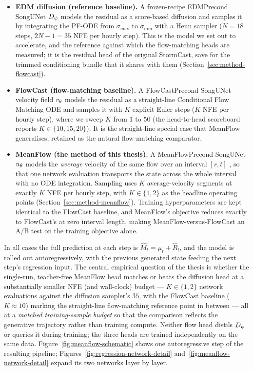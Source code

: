 \begin{itemize}
  \item \textbf{EDM diffusion (reference baseline).} A frozen-recipe EDMPrecond SongUNet $D_{\psi}$ models the residual as a score-based diffusion and samples it by integrating the PF-ODE from $\sigma_{\max}$ to $\sigma_{\min}$ with a Heun sampler ($N = 18$ steps, $2N - 1 = 35$ NFE per hourly step). This is the model we set out to accelerate, and the reference against which the flow-matching heads are measured; it is the residual head of the original StormCast, save for the trimmed conditioning bundle that it shares with them (Section~\ref{sec:method-flowcast}).
  \item \textbf{FlowCast (flow-matching baseline).} A FlowCastPrecond SongUNet velocity field $v_{\theta}$ models the residual as a straight-line Conditional Flow Matching ODE and samples it with $K$ explicit Euler steps ($K$ NFE per hourly step), where we sweep $K$ from $1$ to $50$ (the head-to-head scoreboard reports $K \in \{10, 15, 20\}$). It is the straight-line special case that MeanFlow generalises, retained as the natural flow-matching comparator.
  \item \textbf{MeanFlow (the method of this thesis).} A MeanFlowPrecond SongUNet $u_{\theta}$ models the \emph{average} velocity of the same flow over an interval $[r, t]$ \citep{geng2025meanflow}, so that one network evaluation transports the state across the whole interval with no ODE integration. Sampling uses $K$ average-velocity segments at exactly $K$ NFE per hourly step, with $K \in \{1, 2\}$ as the headline operating points (Section~\ref{sec:method-meanflow}). Training hyperparameters are kept identical to the FlowCast baseline, and MeanFlow's objective reduces exactly to FlowCast's at zero interval length, making MeanFlow-versus-FlowCast an A/B test on the training objective alone.
\end{itemize}

In all cases the full prediction at each step is $\hat{M}_t = \mu_t + \hat{R}_t$, and the model is rolled out autoregressively, with the previous generated state feeding the next step's regression input. The central empirical question of the thesis is whether the single-run, teacher-free MeanFlow head matches or beats the diffusion head at a substantially smaller NFE (and wall-clock) budget --- $K \in \{1, 2\}$ network evaluations against the diffusion sampler's $35$, with the FlowCast baseline ($K \approx 10$) marking the straight-line flow-matching reference point in between --- all at a \emph{matched training-sample budget} so that the comparison reflects the generative trajectory rather than training compute. Neither flow head distils $D_{\psi}$ or queries it during training; the three heads are trained independently on the same data. Figure~\ref{fig:meanflow-schematic} shows one autoregressive step of the resulting pipeline; Figures~\ref{fig:regression-network-detail} and~\ref{fig:meanflow-network-detail} expand its two networks layer by layer.

